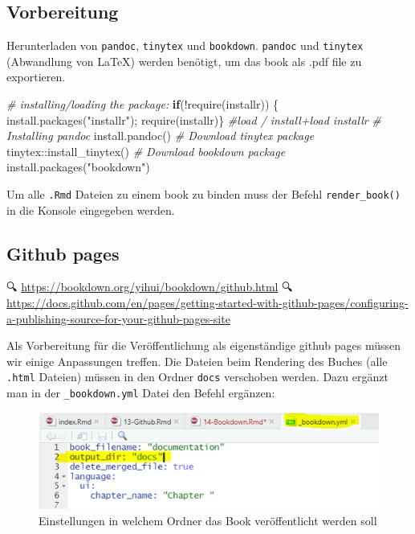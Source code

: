 \documentclass[
]{article}
\newenvironment{Shaded}{\begin{snugshade}}{\end{snugshade}}
\newcommand{\CommentTok}[1]{\textcolor[rgb]{0.56,0.35,0.01}{\textit{#1}}}
\newcommand{\ControlFlowTok}[1]{\textcolor[rgb]{0.13,0.29,0.53}{\textbf{#1}}}
\newcommand{\FunctionTok}[1]{\textcolor[rgb]{0.00,0.00,0.00}{#1}}
\newcommand{\NormalTok}[1]{#1}
\newcommand{\SpecialCharTok}[1]{\textcolor[rgb]{0.00,0.00,0.00}{#1}}
\newcommand{\StringTok}[1]{\textcolor[rgb]{0.31,0.60,0.02}{#1}}
\begin{document}
\hypertarget{vorbereitung}{%
\subsection{Vorbereitung}\label{vorbereitung}}

Herunterladen von \texttt{pandoc}, \texttt{tinytex} und \texttt{bookdown}. \texttt{pandoc} und \texttt{tinytex} (Abwandlung von LaTeX) werden benötigt, um das book als .pdf file zu exportieren.

\begin{Shaded}
\begin{Highlighting}[]
\CommentTok{\# installing/loading the package:}
\ControlFlowTok{if}\NormalTok{(}\SpecialCharTok{!}\FunctionTok{require}\NormalTok{(installr)) \{ }\FunctionTok{install.packages}\NormalTok{(}\StringTok{"installr"}\NormalTok{); }\FunctionTok{require}\NormalTok{(installr)\} }\CommentTok{\#load / install+load installr}
\CommentTok{\# Installing pandoc}
\FunctionTok{install.pandoc}\NormalTok{()}
\CommentTok{\# Download tinytex package}
\NormalTok{tinytex}\SpecialCharTok{::}\FunctionTok{install\_tinytex}\NormalTok{()}
\CommentTok{\# Download bookdown package}
\FunctionTok{install.packages}\NormalTok{(}\StringTok{"bookdown"}\NormalTok{)}
\end{Highlighting}
\end{Shaded}

Um alle \texttt{.Rmd} Dateien zu einem book zu binden muss der Befehl \texttt{render\_book()} in die Konsole eingegeben werden.

\hypertarget{github-pages}{%
\subsection{Github pages}\label{github-pages}}

🔍 \url{https://bookdown.org/yihui/bookdown/github.html}
🔍 \url{https://docs.github.com/en/pages/getting-started-with-github-pages/configuring-a-publishing-source-for-your-github-pages-site}

Als Vorbereitung für die Veröffentlichung als eigenständige github pages müssen wir einige Anpassungen treffen. Die Dateien beim Rendering des Buches (alle \texttt{.html} Dateien) müssen in den Ordner \texttt{docs} verschoben werden. Dazu ergänzt man in der \texttt{\_bookdown.yml} Datei den Befehl ergänzen:

\begin{figure}

{\centering \includegraphics[width=1\linewidth]{images/073} 

}

\caption{Einstellungen in welchem Ordner das Book veröffentlicht werden soll}\label{fig:unnamed-chunk-308}
\end{figure}
\end{document}
